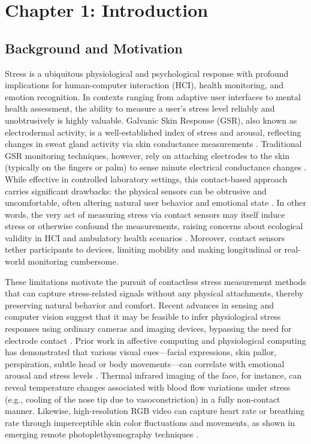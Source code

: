 \label{chap:1}
\chapter{Chapter 1: Introduction}

\section{Background and Motivation}

Stress is a ubiquitous physiological and psychological response with profound
implications for human-computer interaction (HCI), health monitoring, and emotion
recognition.  In contexts ranging from adaptive user interfaces to mental health
assessment, the ability to measure a user's stress level reliably and unobtrusively
is highly valuable.  Galvanic Skin Response (GSR), also known as electrodermal
activity, is a well-established index of stress and arousal, reflecting changes in
sweat gland activity via skin conductance measurements \cite{Boucsein2012}.
Traditional GSR monitoring techniques, however, rely on attaching electrodes to the
skin (typically on the fingers or palm) to sense minute electrical conductance
changes \cite{Fowles1981}.  While effective in controlled laboratory settings, this
contact-based approach carries significant drawbacks: the physical sensors can be
obtrusive and uncomfortable, often altering natural user behavior and emotional state
\cite{Cacioppo2007}.  In other words, the very act of measuring stress via contact
sensors may itself induce stress or otherwise confound the measurements, raising
concerns about ecological validity in HCI and ambulatory health scenarios
\cite{Wilhelm2010}.  Moreover, contact sensors tether participants to devices,
limiting mobility and making longitudinal or real-world monitoring cumbersome.

These limitations motivate the pursuit of contactless stress measurement methods that
can capture stress-related signals without any physical attachments, thereby
preserving natural behavior and comfort.  Recent advances in sensing and computer
vision suggest that it may be feasible to infer physiological stress responses using
ordinary cameras and imaging devices, bypassing the need for electrode
contact \cite{Picard2001}.  Prior work in affective computing and physiological
computing has demonstrated that various visual cues---facial expressions, skin
pallor, perspiration, subtle head or body movements---can correlate with emotional
arousal and stress levels \cite{Healey2005}.  Thermal infrared imaging of the face,
for instance, can reveal temperature changes associated with blood flow variations
under stress (e.g., cooling of the nose tip due to vasoconstriction) in a fully
non-contact manner.  Likewise, high-resolution RGB video can capture heart rate or
breathing rate through imperceptible skin color fluctuations and movements, as shown
in emerging remote photoplethysmography techniques \cite{Poh2010}.

